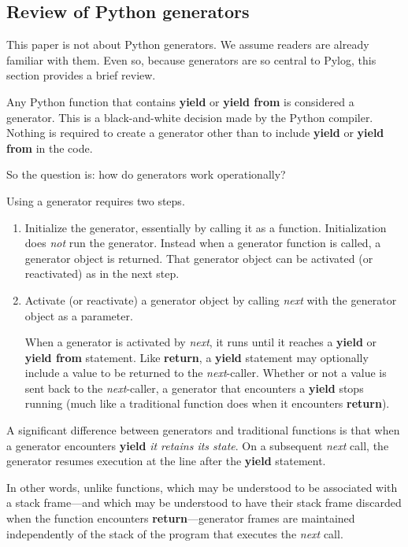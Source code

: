 \subsection{Review of Python generators}

This paper is not about Python generators. We assume readers are already familiar with them. Even so, because generators are so central to Pylog, this section provides a brief review.

\largev
Any Python function that contains \textbf{yield} or \textbf{yield from} is considered a generator. This is a black-and-white decision made by the Python compiler. Nothing is required to create a generator other than to include \textbf{yield} or \textbf{yield from} in the code.

So the question is: how do generators work operationally?

Using a generator requires two steps.
\begin{enumerate}
    \item Initialize the generator, essentially by calling it as a function. Initialization does \textit{not} run the generator. Instead when a generator function is called, a generator object is returned. That generator object can be activated (or reactivated) as in the next step.
    
    \item Activate (or reactivate) a generator object by calling \textit{next} with the generator object as a parameter. 
    
    \smallv
    When a generator is activated by \textit{next}, it runs until it reaches a \textbf{yield} or \textbf{yield from} statement. Like \textbf{return}, a \textbf{yield} statement may optionally include a value to be returned to the \textit{next}-caller. Whether or not a value is sent back to the \textit{next}-caller, a generator that encounters a \textbf{yield} stops running (much like a traditional function does when it encounters \textbf{return}). 
\end{enumerate}
        
    A significant difference between generators and traditional functions is that when a generator encounters \textbf{yield} \textit{it retains its state}. On a subsequent \textit{next} call, the generator resumes execution at the line after the \textbf{yield} statement.
    
    In other words, unlike functions, which may be understood to be associated with a stack frame---and which may be understood to have their stack frame discarded when the function encounters \textbf{return}---generator frames are maintained independently of the stack of the program that executes the  \textit{next} call.
    
